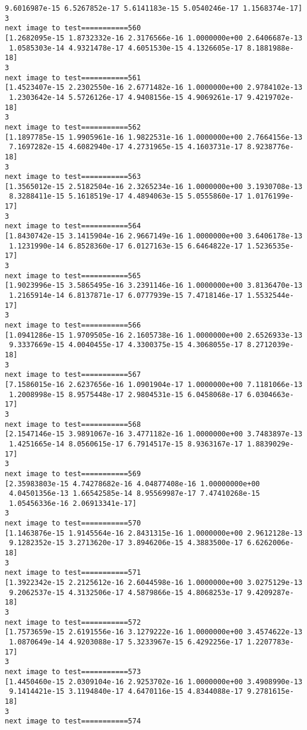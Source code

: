 \documentclass[11pt]{article}
\begin{document}
\begin{Verbatim}[commandchars=\\\{\}]
 9.6016987e-15 6.5267852e-17 5.6141183e-15 5.0540246e-17 1.1568374e-17]
3
next image to test===========560
[1.2682095e-15 1.8732332e-16 2.3176566e-16 1.0000000e+00 2.6406687e-13
 1.0585303e-14 4.9321478e-17 4.6051530e-15 4.1326605e-17 8.1881988e-18]
3
next image to test===========561
[1.4523407e-15 2.2302550e-16 2.6771482e-16 1.0000000e+00 2.9784102e-13
 1.2303642e-14 5.5726126e-17 4.9408156e-15 4.9069261e-17 9.4219702e-18]
3
next image to test===========562
[1.1897785e-15 1.9905961e-16 1.9822531e-16 1.0000000e+00 2.7664156e-13
 7.1697282e-15 4.6082940e-17 4.2731965e-15 4.1603731e-17 8.9238776e-18]
3
next image to test===========563
[1.3565012e-15 2.5182504e-16 2.3265234e-16 1.0000000e+00 3.1930708e-13
 8.3288411e-15 5.1618519e-17 4.4894063e-15 5.0555860e-17 1.0176199e-17]
3
next image to test===========564
[1.8430742e-15 3.1415904e-16 2.9667149e-16 1.0000000e+00 3.6406178e-13
 1.1231990e-14 6.8528360e-17 6.0127163e-15 6.6464822e-17 1.5236535e-17]
3
next image to test===========565
[1.9023996e-15 3.5865495e-16 3.2391146e-16 1.0000000e+00 3.8136470e-13
 1.2165914e-14 6.8137871e-17 6.0777939e-15 7.4718146e-17 1.5532544e-17]
3
next image to test===========566
[1.0941286e-15 1.9709505e-16 2.1605738e-16 1.0000000e+00 2.6526933e-13
 9.3337669e-15 4.0040455e-17 4.3300375e-15 4.3068055e-17 8.2712039e-18]
3
next image to test===========567
[7.1586015e-16 2.6237656e-16 1.0901904e-17 1.0000000e+00 7.1181066e-13
 1.2008998e-15 8.9575448e-17 2.9804531e-15 6.0458068e-17 6.0304663e-17]
3
next image to test===========568
[2.1547146e-15 3.9891067e-16 3.4771182e-16 1.0000000e+00 3.7483897e-13
 1.4251665e-14 8.0560615e-17 6.7914517e-15 8.9363167e-17 1.8839029e-17]
3
next image to test===========569
[2.35983803e-15 4.74278682e-16 4.04877408e-16 1.00000000e+00
 4.04501356e-13 1.66542585e-14 8.95569987e-17 7.47410268e-15
 1.05456336e-16 2.06913341e-17]
3
next image to test===========570
[1.1463876e-15 1.9145564e-16 2.8431315e-16 1.0000000e+00 2.9612128e-13
 9.1282352e-15 3.2713620e-17 3.8946206e-15 4.3883500e-17 6.6262006e-18]
3
next image to test===========571
[1.3922342e-15 2.2125612e-16 2.6044598e-16 1.0000000e+00 3.0275129e-13
 9.2062537e-15 4.3132506e-17 4.5879866e-15 4.8068253e-17 9.4209287e-18]
3
next image to test===========572
[1.7573659e-15 2.6191556e-16 3.1279222e-16 1.0000000e+00 3.4574622e-13
 1.0870649e-14 4.9203088e-17 5.3233967e-15 6.4292256e-17 1.2207783e-17]
3
next image to test===========573
[1.4450460e-15 2.0309104e-16 2.9253702e-16 1.0000000e+00 3.4908990e-13
 9.1414421e-15 3.1194840e-17 4.6470116e-15 4.8344088e-17 9.2781615e-18]
3
next image to test===========574

\end{Verbatim}
\end{document}
